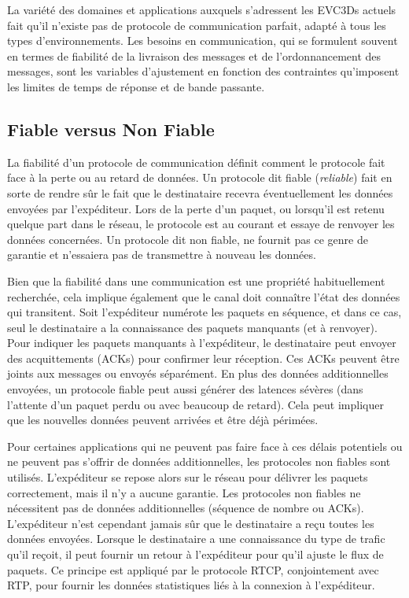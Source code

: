 La variété des domaines et applications auxquels s'adressent les 
\glspl{EVC3D} actuels fait qu'il n'existe pas de protocole de 
communication parfait, adapté à tous les types d'environnements. 
Les besoins en communication, qui se formulent souvent en termes de 
fiabilité de la livraison des messages et de l'ordonnancement des messages, sont 
les variables d'ajustement en fonction des contraintes qu'imposent les limites de 
temps de réponse et de bande passante.

\subsection{Fiable versus Non Fiable}
\label{sec:fiabilite}
La fiabilité d'un protocole de communication définit comment le protocole fait face 
à la perte ou au retard de données. Un protocole dit \og fiable\fg{} (\textit{reliable}) 
fait en sorte de rendre sûr le fait que le destinataire recevra éventuellement les 
données envoyées par l'expéditeur. Lors de la perte d'un paquet, ou lorsqu'il est 
retenu quelque part dans le réseau, le protocole est au courant et essaye de 
renvoyer les données concernées. Un protocole dit \og non fiable\fg{}, ne fournit 
pas ce genre de garantie et n'essaiera pas de transmettre à nouveau les données.

Bien que la fiabilité dans une communication est une propriété habituellement 
recherchée, cela implique également que le canal doit connaître l'état des données 
qui transitent. Soit l'expéditeur numérote les paquets en séquence, et dans ce 
cas, seul le destinataire a la connaissance des paquets manquants (et à 
renvoyer). Pour indiquer les paquets manquants à l'expéditeur, le destinataire peut 
envoyer des acquittements (ACKs) pour confirmer leur réception. Ces ACKs 
peuvent être joints aux messages ou envoyés séparément. En plus des données 
additionnelles envoyées, un protocole fiable peut aussi générer des latences 
sévères (dans l'attente d'un paquet perdu ou avec beaucoup de retard). Cela peut 
impliquer que les \og nouvelles\fg{} données peuvent arrivées et être déjà 
périmées.

Pour certaines applications qui ne peuvent pas faire face à ces délais potentiels 
ou ne peuvent pas s'offrir de données additionnelles, les protocoles non fiables 
sont utilisés. 
L'expéditeur se repose alors sur le réseau pour délivrer les paquets 
correctement, mais il n'y a aucune garantie. Les protocoles non fiables ne 
nécessitent pas de données additionnelles (séquence de nombre ou ACKs). 
L'expéditeur n'est cependant jamais sûr que le destinataire a reçu toutes les 
données envoyées. Lorsque le destinataire a une connaissance du type de trafic qu'il reçoit, 
il peut fournir un retour à l'expéditeur pour qu'il ajuste le flux de paquets. Ce 
principe est appliqué par le protocole \gls{RTCP}, conjointement avec \gls{RTP}, 
pour fournir les données statistiques liés à la  connexion à l'expéditeur.

